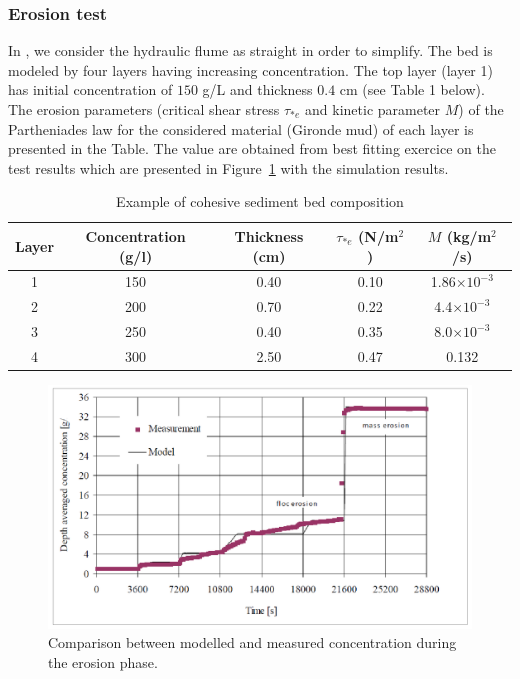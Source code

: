 \subsubsection{Erosion test}

In \sisyphe, we consider the hydraulic flume as straight in order to
simplify. The bed is modeled by four layers having increasing concentration.
The top layer (layer 1) has initial concentration of $150$ g/L and thickness
$0.4$ cm (see Table 1 below). The erosion parameters (critical shear stress $\tau_{*e}$ and kinetic parameter $M$) 
of the Partheniades law for the considered material (Gironde mud) of each layer is presented in the
Table. The value are obtained from best fitting exercice on the test results
which are presented in Figure~\ref{fig:5} with the simulation results. 

\begin{table}
\begin{center}
   \caption{\label{tab:1} Example
of cohesive sediment bed composition}
\begin{tabular}{|c|c|c|c|c|}
  \hline
  Layer & Concentration (g/l) & Thickness (cm) & $\tau_{*e}$ (N/m$^2$) & $M$ (kg/m$^2$/s) \\
  \hline
  1 & 150 & 0.40 & 0.10 & 1.86$\times 10^{-3}$\\
  2 & 200 & 0.70 & 0.22 & 4.4$\times 10^{-3}$ \\
  3 & 250 & 0.40 & 0.35 & 8.0$\times 10^{-3}$\\
  4 & 300 & 2.50 & 0.47 & 0.132\\
  \hline
\end{tabular}
\end{center}
\end{table}

\begin{figure}[H]
\begin{center}
\includegraphics[scale=0.35,angle=0]{graphics/fig5.png}
\caption{Comparison between modelled and measured concentration during the erosion
phase.}\label{fig:5}
\end{center}
\end{figure}

